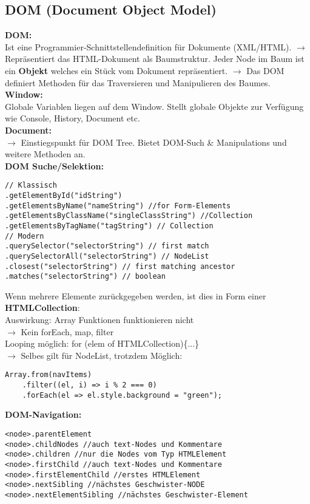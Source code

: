 \documentclass[7pt,landscape,a4paper]{scrartcl}
\begin{document}
\begin{multicols*}{4}
\section{DOM (Document Object Model)}
	\textcolor{b}{\textbf{DOM:}}\\
	Ist eine Programmier-Schnittstellendefinition für Dokumente (XML/HTML). $\rightarrow$ Repräsentiert das HTML-Dokument als \textcolor{b}{Baumstruktur}. Jeder Node im Baum ist ein \textbf{Objekt} welches ein Stück vom Dokument repräsentiert. $\rightarrow$ Das DOM definiert Methoden für das \textcolor{b}{Traversieren} und \textcolor{b}{Manipulieren} des Baumes.\\
	\textcolor{b}{\textbf{Window:}}\\
	Globale Variablen liegen auf dem Window. Stellt globale Objekte zur Verfügung wie \textcolor{b}{Console, History, Document etc.}\\
	\textcolor{b}{\textbf{Document:}}\\
	$\rightarrow$ Einstiegspunkt für DOM Tree. Bietet DOM-Such \& Manipulations und weitere Methoden an.\\
	\textcolor{b}{\textbf{DOM Suche/Selektion:}}
\begin{lstlisting}[style=htmlcssjs]
// Klassisch
.getElementById("idString")
.getElementsByName("nameString") //for Form-Elements
.getElementsByClassName("singleClassString") //Collection
.getElementsByTagName("tagString") // Collection
// Modern
.querySelector("selectorString") // first match
.querySelectorAll("selectorString") // NodeList
.closest("selectorString") // first matching ancestor
.matches("selectorString") // boolean
\end{lstlisting}
	Wenn mehrere Elemente zurückgegeben werden, ist dies in Form einer \textbf{HTMLCollection}:\\
	\textcolor{b}{Auswirkung:} Array Funktionen funktionieren nicht\\
	$\rightarrow$ Kein forEach, map, filter\\
	\textcolor{b}{Looping möglich:} for (elem of HTMLCollection)\{...\}\\
	$\rightarrow$ Selbes gilt für NodeList, trotzdem Möglich:
\begin{lstlisting}[style=htmlcssjs]
Array.from(navItems)
	.filter((el, i) => i % 2 === 0)
	.forEach(el => el.style.background = "green");
\end{lstlisting}
	\textcolor{b}{\textbf{DOM-Navigation:}}
\begin{lstlisting}[style=htmlcssjs]
<node>.parentElement
<node>.childNodes //auch text-Nodes und Kommentare
<node>.children //nur die Nodes vom Typ HTMLElement
<node>.firstChild //auch text-Nodes und Kommentare
<node>.firstElementChild //erstes HTMLElement
<node>.nextSibling //nächstes Geschwister-NODE
<node>.nextElementSibling //nächstes Geschwister-Element
\end{lstlisting}

\end{multicols*}
\end{document}
